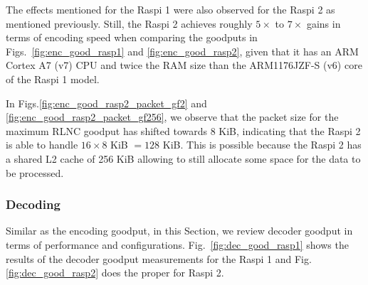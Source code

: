 %
\par
The effects mentioned for the \ac{Raspi} 1 were also observed for
the \ac{Raspi} 2 as mentioned previously. Still, the \ac{Raspi} 2 achieves
roughly $5\times$ to $7\times$ gains in terms of encoding speed when comparing
the goodputs in Figs.~\ref{fig:enc_good_rasp1} and \ref{fig:enc_good_rasp2},
given that it has an \ac{ARM} Cortex A7 (v7) \ac{CPU} and twice the \ac{RAM}
size than the \ac{ARM}1176JZF-S (v6) core of the \ac{Raspi} 1 model.

In Figs.\ref{fig:enc_good_rasp2_packet_gf2} and
\ref{fig:enc_good_rasp2_packet_gf256}, we observe that the packet size for
the maximum \ac{RLNC} goodput has shifted towards 8 KiB, indicating that
the \ac{Raspi} 2 is able to handle $16 \times 8$ KiB $= 128$ KiB. This is
possible because the \ac{Raspi} 2 has a shared L2 cache of 256 KiB allowing
to still allocate some space for the data to be processed.

\subsubsection{Decoding}
Similar as the encoding goodput, in this Section, we review decoder
goodput in terms of performance and configurations.
Fig.~\ref{fig:dec_good_rasp1} shows the results of the decoder goodput
measurements for the \ac{Raspi} 1 and Fig. \ref{fig:dec_good_rasp2} does
the proper for \ac{Raspi} 2.

